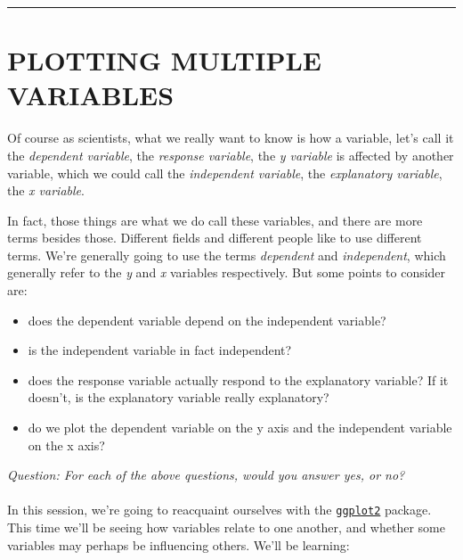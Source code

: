 \documentclass[
]{book}
\providecommand{\tightlist}{%
  \setlength{\itemsep}{0pt}\setlength{\parskip}{0pt}}
\begin{document}
\begin{center}\rule{0.5\linewidth}{0.5pt}\end{center}

\hypertarget{plotting-multiple-variables}{%
\section{PLOTTING MULTIPLE VARIABLES}\label{plotting-multiple-variables}}

Of course as scientists, what we really want to know is how a variable, let's
call it the \emph{dependent variable}, the \emph{response variable}, the \emph{y variable} is
affected by another variable, which we could call the \emph{independent variable}, the
\emph{explanatory variable}, the \emph{x variable}.

In fact, those things are what we do call these variables, and there are more
terms besides those. Different fields and different people like to use different
terms. We're generally going to use the terms \emph{dependent} and \emph{independent},
which generally refer to the \emph{y} and \emph{x} variables respectively. But
some points to consider are:

\begin{itemize}
\tightlist
\item
  does the dependent variable depend on the independent variable?
\item
  is the independent variable in fact independent?
\item
  does the response variable actually respond to the explanatory variable? If
  it doesn't, is the explanatory variable really explanatory?
\item
  do we plot the dependent variable on the y axis and the independent
  variable on the x axis?
\end{itemize}

\emph{Question: For each of the above questions, would you answer yes, or no?}\\
~\\

In this session, we're going to reacquaint ourselves with the
\href{https://ggplot2.tidyverse.org/}{\texttt{ggplot2}} package. This time we'll be seeing
how variables relate to one another, and whether some variables may perhaps
be influencing others. We'll be learning:
\end{document}
